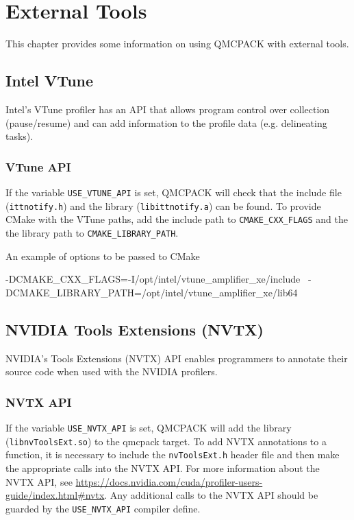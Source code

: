 \chapter{External Tools}
\label{chap:external_tools}
This chapter provides some information on using QMCPACK with external tools.

\section{Intel VTune}

Intel's VTune profiler has an API that allows program control over collection (pause/resume) and can add information to the profile data (e.g. delineating tasks).

\subsection{VTune API}

If the variable \texttt{USE\_VTUNE\_API} is set, QMCPACK will check that the
include file (\texttt{ittnotify.h}) and the library (\texttt{libittnotify.a}) can
be found.
To provide CMake with the VTune paths, add the include path to \texttt{CMAKE\_CXX\_FLAGS} and the the library path to \texttt{CMAKE\_LIBRARY\_PATH}.

An example of options to be passed to CMake
\begin{shade}
 -DCMAKE_CXX_FLAGS=-I/opt/intel/vtune_amplifier_xe/include \
 -DCMAKE_LIBRARY_PATH=/opt/intel/vtune_amplifier_xe/lib64
\end{shade}

\section{NVIDIA Tools Extensions (NVTX)}

NVIDIA's Tools Extensions (NVTX) API enables programmers to annotate their source code when used with the NVIDIA profilers.

\subsection{NVTX API}

If the variable \texttt{USE\_NVTX\_API} is set, QMCPACK will add the library (\texttt{libnvToolsExt.so}) to the qmcpack target. To add NVTX annotations
to a function, it is necessary to include the \texttt{nvToolsExt.h} header file and then make the appropriate calls into the NVTX API. For more information
about the NVTX API, see \url{https://docs.nvidia.com/cuda/profiler-users-guide/index.html#nvtx}. Any additional calls to the NVTX API should be guarded by
the \texttt{USE\_NVTX\_API} compiler define.

